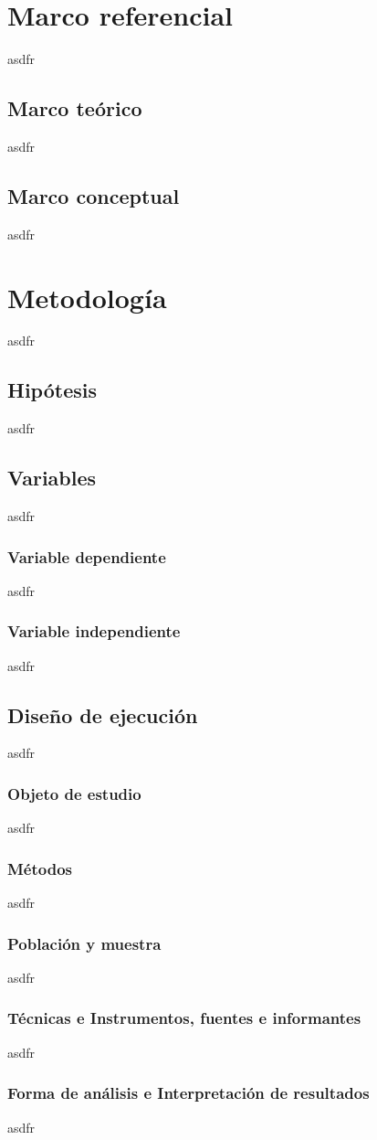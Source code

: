 \documentclass{report}
\begin{document}
\chapter{Marco referencial}
asdfr
\section{Marco teórico}
asdfr
\section{Marco conceptual}
asdfr
\chapter{Metodología}
asdfr
\section{Hipótesis}
asdfr
\section{Variables}
asdfr
\subsection{Variable dependiente}
asdfr
\subsection{Variable independiente}
asdfr
\section{Diseño de ejecución}
asdfr
\subsection{Objeto de estudio}
asdfr
\subsection{Métodos}
asdfr
\subsection{Población y muestra}
asdfr
\subsection{Técnicas e Instrumentos, fuentes e informantes}
asdfr
\subsection{Forma de análisis e Interpretación de resultados}
asdfr
\end{document}
